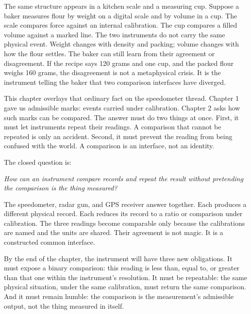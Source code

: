\begin{chapteressay}
The same structure appears in a kitchen scale and a measuring cup. Suppose a
baker measures flour by weight on a digital scale and by volume in a cup. The
scale compares force against an internal calibration. The cup compares a filled
volume against a marked line. The two instruments do not carry the same physical
event. Weight changes with density and packing; volume changes with how the
flour settles. The baker can still learn from their agreement or disagreement.
If the recipe says 120 grams and one cup, and the packed flour weighs 160 grams,
the disagreement is not a metaphysical crisis. It is the instrument telling the
baker that two comparison interfaces have diverged.

This chapter overlays that ordinary fact on the speedometer thread. Chapter 1
gave us admissible marks: events carried under calibration. Chapter 2 asks how
such marks can be compared. The answer must do two things at once. First, it
must let instruments repeat their readings. A comparison that cannot be repeated
is only an accident. Second, it must prevent the reading from being confused
with the world. A comparison is an interface, not an identity.

The closed question is:

\begin{center}
\emph{How can an instrument compare records and repeat the result without
pretending the comparison is the thing measured?}
\end{center}

The speedometer, radar gun, and GPS receiver answer together. Each produces a
different physical record. Each reduces its record to a ratio or comparison
under calibration. The three readings become comparable only because the
calibrations are named and the units are shared. Their agreement is not magic.
It is a constructed common interface.

By the end of the chapter, the instrument will have three new obligations. It
must expose a binary comparison: this reading is less than, equal to, or greater
than that one within the instrument's resolution. It must be repeatable: the
same physical situation, under the same calibration, must return the same
comparison. And it must remain humble: the comparison is the measurement's
admissible output, not the thing measured in itself.

\end{chapteressay}


